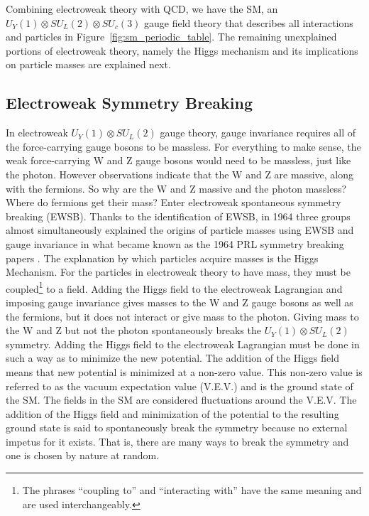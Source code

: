 Combining electroweak theory with QCD, we have the SM, an $U_{Y}(1) \otimes SU_{L}(2) \otimes SU_{c}(3)$ gauge field theory that describes all interactions and particles in
Figure~\ref{fig:sm_periodic_table}. The remaining unexplained portions of electroweak theory, namely the Higgs mechanism and its implications on particle masses are explained next.

\subsection{Electroweak Symmetry Breaking}

In electroweak $U_{Y}(1) \otimes SU_{L}(2)$ gauge theory, gauge invariance requires all of the force-carrying gauge bosons to be massless.
For everything to make sense, the weak force-carrying W and Z gauge bosons would need to be massless, just like the photon. 
However observations indicate that the W and Z are massive, along with the fermions.
So why are the W and Z massive and the photon massless? Where do fermions get their mass?
Enter electroweak spontaneous symmetry breaking (EWSB). Thanks to the identification of EWSB, in 1964 
three groups almost simultaneously explained the origins of particle masses using EWSB and gauge invariance in what became known as the 1964 PRL symmetry breaking papers
\cite{1964_prl_englert}\cite{1964_prl_higgs}\cite{1964_prl_guralnik}.
The explanation by which particles acquire masses is the Higgs Mechanism. For the particles in electroweak theory to have mass, they must be coupled\footnote{The phrases
``coupling to'' and ``interacting with'' have the same meaning and are used interchangeably.} to a field.
Adding the Higgs field to the electroweak Lagrangian and imposing gauge invariance gives masses to the W and Z gauge bosons as well as the fermions, but it does not interact
or give mass to the photon. Giving mass to the W and Z but not the photon spontaneously breaks the $U_{Y}(1) \otimes SU_{L}(2)$ symmetry.
Adding the Higgs field to the electroweak Lagrangian must be done in such a way as to minimize the new potential. The addition of the Higgs field means that new potential
is minimized at a non-zero value. This non-zero value is referred to as the vacuum expectation value (V.E.V.) and is the ground state of the SM.
The fields in the SM are considered fluctuations around the V.E.V. The addition of the Higgs field and minimization of the potential to the resulting ground state
is said to spontaneously break the symmetry because no external impetus for it exists. That is, there are many ways to break the symmetry and one is chosen by nature at random.
